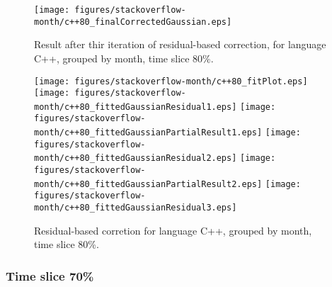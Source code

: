 \begin{figure}[]
\centering
{\texttt{[image: figures/stackoverflow-month/c++80\_finalCorrectedGaussian.eps]}}
\caption{Result after thir iteration of residual-based correction, for language C++, grouped by month, time slice 80\%.}
\end{figure}


\begin{figure}[hb]
\centering
{}
{\texttt{[image: figures/stackoverflow-month/c++80\_fitPlot.eps]}}
{\texttt{[image: figures/stackoverflow-month/c++80\_fittedGaussianResidual1.eps]}}
{\texttt{[image: figures/stackoverflow-month/c++80\_fittedGaussianPartialResult1.eps]}}
{\texttt{[image: figures/stackoverflow-month/c++80\_fittedGaussianResidual2.eps]}}
{\texttt{[image: figures/stackoverflow-month/c++80\_fittedGaussianPartialResult2.eps]}}
{\texttt{[image: figures/stackoverflow-month/c++80\_fittedGaussianResidual3.eps]}}
\caption{Residual-based corretion for language C++, grouped by month, time slice 80\%.}
\end{figure}


\clearpage 
\newpage 


\FloatBarrier

\subsubsection{Time slice 70\%}

